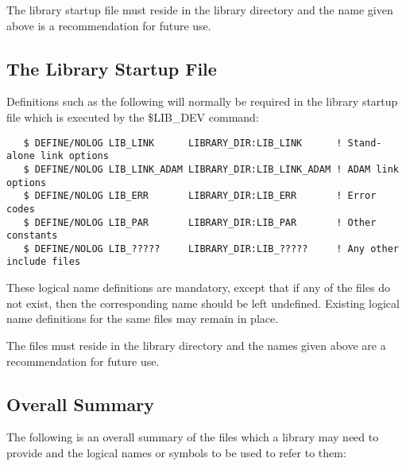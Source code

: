 The library startup file must reside in the library directory and the name
given above is a recommendation for future use.

\subsection{The Library Startup File}

Definitions such as the following will normally be required in the library
startup file which is executed by the \$LIB\_DEV command:

\begin{verbatim}
   $ DEFINE/NOLOG LIB_LINK      LIBRARY_DIR:LIB_LINK      ! Stand-alone link options
   $ DEFINE/NOLOG LIB_LINK_ADAM LIBRARY_DIR:LIB_LINK_ADAM ! ADAM link options
   $ DEFINE/NOLOG LIB_ERR       LIBRARY_DIR:LIB_ERR       ! Error codes
   $ DEFINE/NOLOG LIB_PAR       LIBRARY_DIR:LIB_PAR       ! Other constants
   $ DEFINE/NOLOG LIB_?????     LIBRARY_DIR:LIB_?????     ! Any other include files
\end{verbatim}

These logical name definitions are mandatory, except that if any of the
files do not exist, then the corresponding name should be left undefined.
Existing logical name definitions for the same files may remain in place.

The files must reside in the library directory and the names given above are
a recommendation for future use.

\subsection{Overall Summary}

The following is an overall summary of the files which a library may need to
provide and the logical names or symbols to be used to refer to them:

